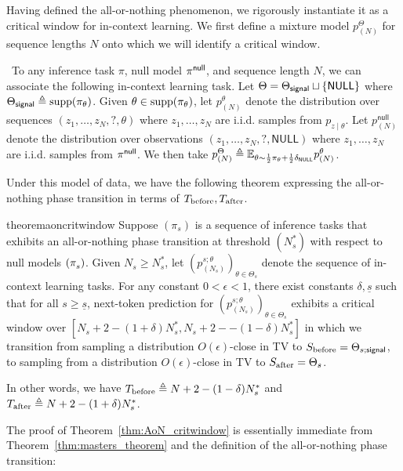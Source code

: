 Having defined the all-or-nothing phenomenon, we rigorously instantiate it as a critical window for in-context learning. We first define a mixture model $p^\Theta_{(N)}$ for sequence lengths $N$ onto which we will identify a critical window.
\begin{definition}\
    To any inference task $\pi$, null model $\pi^{\sf null}$, and sequence length $N$, we can associate the following in-context learning task. Let $\Theta = \Theta_{\sf signal} \sqcup \{\mathsf{NULL}\}$ where $\Theta_{\sf signal} \triangleq \mathrm{supp}(\pi_{\theta})$. Given $\theta\in\mathrm{\mathrm{supp}}(\pi_\theta)$, let $p_{(N)}^\theta$ denote the distribution over sequences $(z_1,\ldots,z_N,\mathrm{?},\theta)$ where $z_1,\ldots,z_N$ are i.i.d. samples from $p_{z\mid \theta}$. Let $p_{(N)}^{\mathsf{null}}$ denote the distribution over observations $(z_1,\ldots,z_N,\mathrm{?},\mathsf{NULL})$ where $z_1,\ldots,z_N$ are i.i.d. samples from $\pi^{\sf null}$. We then take $p^\Theta_{(N)} \triangleq \mathbb{E}_{\theta\sim \frac12 \pi_\theta + \frac12\delta_{\mathsf{NULL}}} p_{(N)}^\theta$.
\end{definition}
Under this model of data, we have the following theorem expressing the all-or-nothing phase transition in terms of $T_{\mathrm{before}},T_{\mathrm{after}}$.
\begin{restatable}{theorem}{aoncritwindow}
\label{thm:AoN_critwindow}
    Suppose $(\pi_s)$ is a sequence of inference tasks that exhibits an all-or-nothing phase transition at threshold $(N^*_s)$ with respect to null models $(\pi^{\sf}_s)$. Given $N_s \ge N^*_s$, let $(p_{(N_s)}^{s;\theta})_{\theta\in \Theta_s}$ denote the sequence of in-context learning tasks. For any constant $0 < \epsilon < 1$, there exist constants $\delta, \underline{s}$ such that for all $s \ge \underline{s}$, next-token prediction for $(p_{(N_s)}^{s;\theta})_{\theta\in \Theta_s}$ exhibits a critical window over $[N_s + 2 - (1 + \delta)N^*_s, N_s + 2 - - (1 - \delta)N^*_s]$ in which we transition from sampling a distribution $O(\epsilon)$-close in TV to $S_{\rm before} = \Theta_{s; \mathsf{signal}}$, to sampling from a distribution $O(\epsilon)$-close in TV to $S_{\rm after} = \Theta_s$. 
    
    In other words, we have $T_{\mathrm{before}}\triangleq N+2-(1 - \delta)N^*_s$ and $T_{\mathrm{after}}\triangleq N+2-(1+ \delta)N^*_s$. 
\end{restatable}
The proof of Theorem~\ref{thm:AoN_critwindow} is essentially immediate from Theorem~\ref{thm:masters_theorem} and the definition of the all-or-nothing phase transition:
